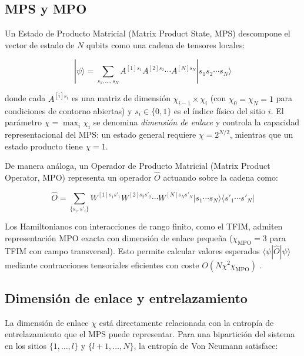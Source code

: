 \documentclass[11pt,a4paper,spanish]{book}
\begin{document}
\subsection{MPS y MPO}

Un Estado de Producto Matricial (Matrix Product State, MPS) descompone el vector de estado de $N$ qubits como una cadena de tensores locales:

\begin{equation}
|\psi\rangle = \sum_{s_1, \ldots, s_N} A^{[1]s_1} A^{[2]s_2} \cdots A^{[N]s_N} |s_1 s_2 \cdots s_N\rangle
\label{eq:mps}
\end{equation}

\noindent donde cada $A^{[i]s_i}$ es una matriz de dimensión $\chi_{i-1} \times \chi_i$ (con $\chi_0 = \chi_N = 1$ para condiciones de contorno abiertas) y $s_i \in \{0, 1\}$ es el índice físico del sitio $i$. El parámetro $\chi = \max_i \chi_i$ se denomina \emph{dimensión de enlace} y controla la capacidad representacional del MPS: un estado general requiere $\chi = 2^{N/2}$, mientras que un estado producto tiene $\chi = 1$.

De manera análoga, un Operador de Producto Matricial (Matrix Product Operator, MPO) representa un operador $\hat{O}$ actuando sobre la cadena como:

\begin{equation}
\hat{O} = \sum_{\{s_i, s'_i\}} W^{[1]s_1 s'_1} W^{[2]s_2 s'_2} \cdots W^{[N]s_N s'_N} |s_1 \cdots s_N\rangle \langle s'_1 \cdots s'_N|
\label{eq:mpo}
\end{equation}

\noindent Los Hamiltonianos con interacciones de rango finito, como el TFIM, admiten representación MPO exacta con dimensión de enlace pequeña ($\chi_{\text{MPO}} = 3$ para TFIM con campo transversal). Esto permite calcular valores esperados $\langle \psi | \hat{O} | \psi \rangle$ mediante contracciones tensoriales eficientes con coste $O(N \chi^2 \chi_{\text{MPO}})$ \citep{schollwock2011}.

\subsection{Dimensión de enlace y entrelazamiento}

La dimensión de enlace $\chi$ está directamente relacionada con la entropía de entrelazamiento que el MPS puede representar. Para una bipartición del sistema en los sitios $\{1, \ldots, l\}$ y $\{l+1, \ldots, N\}$, la entropía de Von Neumann satisface:
\end{document}
